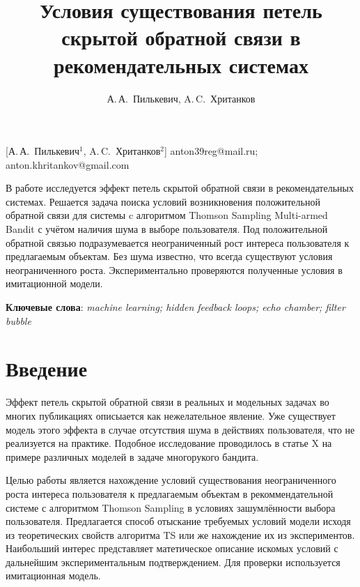 \documentclass[12pt, twoside]{article}
\begin{document}
\title
    [] %
    {Условия существования петель скрытой обратной связи в рекомендательных системах}
\author
    [А.\,А.~Пилькевич] %
    {А.\,А.~Пилькевич, A.\,C.~Хританков} %
    [А.\,А.~Пилькевич$^1$, A.\,C.~Хританков$^2$] %
\email
   {anton39reg@mail.ru; anton.khritankov@gmail.com}
\abstract
  {В работе исследуется эффект  петель скрытой обратной связи в рекомендательных системах.
  Решается задача поиска условий возникновения положительной обратной связи для системы c алгоритмом Thomson Sampling Multi-armed Bandit с учётом наличия шума в выборе пользователя.
  Под положительной обратной связью подразумевается неограниченный рост интереса пользователя к предлагаемым объектам. 
  Без шума известно, что всегда существуют условия неограниченного роста. 
  Экспериментально проверяются полученные условия в имитационной модели.

\bigskip
\noindent
\textbf{Ключевые слова}: \emph {machine learning; hidden feedback loops; echo chamber; filter bubble}
}

\doi{}
\receivedRus{}
\receivedEng{}

\maketitle
\linenumbers

\section{Введение}
Эффект петель скрытой обратной связи в реальных и модельных задачах во многих публикациях описыается как нежелательное явление. 
Уже существует модель этого эффекта в случае отсутствия шума в действиях пользователя, что не реализуется на практике. 
Подобное исследование проводилось в статье X на примере различных моделей в задаче многорукого бандита. 

Целью работы является нахождение условий существования неограниченного роста интереса пользователя к предлагаемым объектам в рекоммендательной системе с алгоритмом Thomson Sampling в условиях зашумлённости выбора пользователя. 
Предлагается способ отыскание требуемых условий модели исходя из теоретических свойств алгоритма TS или же нахождение их из экспериментов. 
Наибольший интерес представляет матетическое описание искомых условий с дальнейшим экспериментальным подтверждением.
Для проверки используется имитационная модель. 
\end{document}
